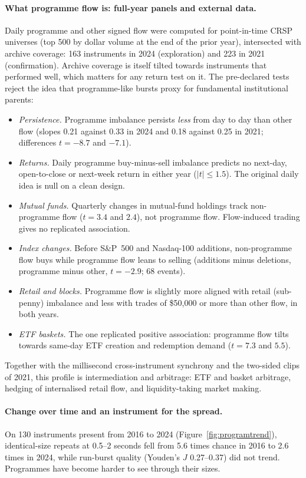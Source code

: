\documentclass[11pt]{article}
\begin{document}
\paragraph{What programme flow is: full-year panels and external data.} Daily programme and
other signed flow were computed for point-in-time CRSP universes (top 500 by dollar volume at the
end of the prior year), intersected with archive coverage: 163 instruments in 2024 (exploration)
and 223 in 2021 (confirmation). Archive coverage is itself tilted towards instruments that
performed well, which matters for any return test on it. The pre-declared tests reject the idea
that programme-like bursts proxy for fundamental institutional parents:
\begin{itemize}
\item \emph{Persistence.} Programme imbalance persists \emph{less} from day to day than other
  flow (slopes 0.21 against 0.33 in 2024 and 0.18 against 0.25 in 2021; differences $t=-8.7$ and
  $-7.1$).
\item \emph{Returns.} Daily programme buy-minus-sell imbalance predicts no next-day, open-to-close
  or next-week return in either year ($|t|\le1.5$). The original daily idea is null on a clean
  design.
\item \emph{Mutual funds.} Quarterly changes in mutual-fund holdings track non-programme flow
  ($t=3.4$ and $2.4$), not programme flow. Flow-induced trading gives no replicated association.
\item \emph{Index changes.} Before S\&P~500 and Nasdaq-100 additions, non-programme flow buys
  while programme flow leans to selling (additions minus deletions, programme minus other,
  $t=-2.9$; 68 events).
\item \emph{Retail and blocks.} Programme flow is slightly more aligned with retail (sub-penny)
  imbalance and less with trades of \$50{,}000 or more than other flow, in both years.
\item \emph{ETF baskets.} The one replicated positive association: programme flow tilts towards
  same-day ETF creation and redemption demand ($t=7.3$ and $5.5$).
\end{itemize}
Together with the millisecond cross-instrument synchrony and the two-sided clips of 2021, this
profile is intermediation and arbitrage: ETF and basket arbitrage, hedging of internalised retail
flow, and liquidity-taking market making.

\paragraph{Change over time and an instrument for the spread.} On 130 instruments present from
2016 to 2024 (Figure~\ref{fig:programtrend}), identical-size repeats at 0.5--2 seconds fell from
5.6 times chance in 2016 to 2.6 times in 2024, while run-burst quality (Youden's $J$ 0.27--0.37) did
not trend. Programmes have become harder to see through their sizes.
\end{document}
